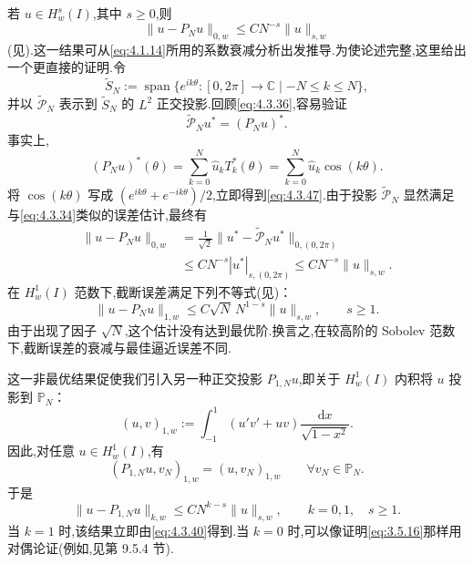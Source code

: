 若 \(u\in H_w^s(I)\),其中 \(s\ge0\),则
\begin{equation}\label{eq:4.3.46}
  \|u-P_Nu\|_{0,w}\le CN^{-s}\|u\|_{s,w}
\end{equation}
(见).这一结果可从\eqref{eq:4.1.14}所用的系数衰减分析出发推导.为使论述完整,这里给出一个更直接的证明.令
\[
  \widetilde S_N:=\operatorname{span}\{e^{ik\theta}\colon[0,2\pi]\to\mathbb C
    \mid -N\le k\le N\},
\]
并以 \(\widetilde{\mathcal P}_N\) 表示到 \(\widetilde S_N\) 的 \(L^2\) 正交投影.回顾\eqref{eq:4.3.36},容易验证
\begin{equation}\label{eq:4.3.47}
  \widetilde{\mathcal P}_Nu^*=(P_Nu)^*.
\end{equation}
事实上,
\[
  (P_Nu)^*(\theta)=\sum_{k=0}^N\widehat u_k T_k^*(\theta)
    =\sum_{k=0}^N\widehat u_k\cos(k\theta).
\]
将 \(\cos(k\theta)\) 写成 \((e^{ik\theta}+e^{-ik\theta})/2\),立即得到\eqref{eq:4.3.47}.由于投影 \(\widetilde{\mathcal P}_N\) 显然满足与\eqref{eq:4.3.34}类似的误差估计,最终有
\[
  \begin{aligned}
    \|u-P_Nu\|_{0,w}
    &=\frac1{\sqrt2}\|u^*-\widetilde{\mathcal P}_Nu^*\|_{0,(0,2\pi)}\\
    &\le CN^{-s}|u^*|_{s,(0,2\pi)}\le CN^{-s}\|u\|_{s,w}.
  \end{aligned}
\]
在 \(H_w^1(I)\) 范数下,截断误差满足下列不等式(见)：
\begin{equation}\label{eq:4.3.48}
  \|u-P_Nu\|_{1,w}\le C\sqrt N\,N^{1-s}\|u\|_{s,w},\qquad s\ge1.
\end{equation}
由于出现了因子 \(\sqrt N\),这个估计没有达到最优阶.换言之,在较高阶的 Sobolev 范数下,截断误差的衰减与最佳逼近误差不同.

这一非最优结果促使我们引入另一种正交投影 \(P_{1,N}u\),即关于 \(H_w^1(I)\) 内积将 \(u\) 投影到 \(\mathbb P_N\)：
\begin{equation}\label{eq:4.3.49}
  (u,v)_{1,w}:=\int_{-1}^1(u'v'+uv)\frac{\mathrm dx}{\sqrt{1-x^2}}.
\end{equation}
因此,对任意 \(u\in H_w^1(I)\),有
\begin{equation}\label{eq:4.3.50}
  (P_{1,N}u,v_N)_{1,w}=(u,v_N)_{1,w}\qquad\forall v_N\in\mathbb P_N.
\end{equation}
于是
\begin{equation}\label{eq:4.3.51}
  \|u-P_{1,N}u\|_{k,w}\le CN^{k-s}\|u\|_{s,w},
  \qquad k=0,1,\quad s\ge1.
\end{equation}
当 \(k=1\) 时,该结果立即由\eqref{eq:4.3.40}得到.当 \(k=0\) 时,可以像证明\eqref{eq:3.5.16}那样用对偶论证(例如,见第 9.5.4 节).

